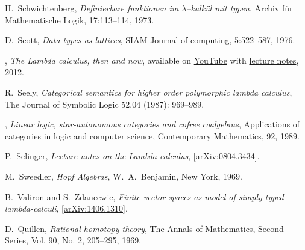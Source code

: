 \documentclass[english,letter paper,12pt,reqno]{article}
\theoremstyle{example}
\numberwithin{equation}{section}
\begin{document}
\begin{thebibliography}{BHLS03}

H.~Schwichtenberg, \textsl{Definierbare funktionen im $\lambda$--kalk\"ul mit typen}, Archiv f\"ur Mathematische Logik, 17:113–114, 1973.

D.~Scott, \textsl{Data types as lattices}, SIAM Journal of computing, 5:522--587, 1976.

\bysame, \textsl{The {L}ambda calculus, then and now}, available on \href{http://www.youtube.com/watch?v=7cPtCpyBPNI}{YouTube} with \href{http://turing100.acm.org/lambda_calculus_timeline.pdf}{lecture notes}, 2012.

R.~Seely, \textsl{Categorical semantics for higher order polymorphic lambda calculus}, The Journal of Symbolic Logic 52.04 (1987): 969--989.

\bysame, \textsl{Linear logic, star-autonomous categories and cofree coalgebras}, Applications of categories in logic and computer science, Contemporary Mathematics, 92, 1989.

P.~Selinger, \textsl{Lecture notes on the {L}ambda calculus}, \href{http://arxiv.org/abs/0804.3434}{[arXiv:0804.3434]}.


  
M.~Sweedler, \textsl{Hopf Algebras}, W.~A.~Benjamin, New York, 1969.

B.~Valiron and S.~Zdancewic, \textsl{Finite vector spaces as model of simply-typed lambda-calculi}, \href{http://arxiv.org/abs/1406.1310v1}{[arXiv:1406.1310]}.

D.~Quillen, \textsl{Rational homotopy theory}, The Annals of Mathematics, Second Series, Vol. 90, No. 2, 205--295, 1969.


  

\end{thebibliography}
\end{document}
